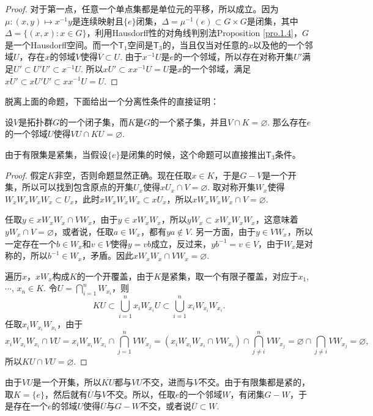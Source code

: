 \begin{proof}
	对于第一点，任意一个单点集都是单位元的平移，所以成立。因为$\mu:(x,y)\mapsto x^{-1}y$是连续映射且$\{e\}$闭集，$\Delta=\mu^{-1}(e)\subset G\times G$是闭集，其中$\Delta=\{(x,x):x\in G\}$，利用Hausdorff性的对角线判别法Proposition \ref{pro.1.4}，$G$是一个Hausdorff空间。而一个$\mathsf{T}_1$空间是$\mathsf{T}_3$的，当且仅当对任意的$x$以及他的一个邻域$U$，存在$x$的邻域$V$使得$\overline{V}\subset U$. 由于$x^{-1}U$是$e$的一个邻域，所以存在对称开集$U'$满足$U'\subset U'U'\subset x^{-1}U$. 所以$xU'\subset xx^{-1}U=U$是$x$的一个邻域，满足$\overline{xU'}\subset xU'U'\subset xx^{-1}U=U$.
\end{proof}

脱离上面的命题，下面给出一个分离性条件的直接证明：

\begin{pro}\label{1.16}
设$V$是拓扑群$G$的一个闭子集，而$K$是$G$的一个紧子集，并且$V\cap K=\varnothing$. 那么存在$e$的一个邻域$U$使得$VU\cap KU=\varnothing$.
\end{pro}

由于有限集是紧集，当假设$\{e\}$是闭集的时候，这个命题可以直接推出$\mathsf{T}_3$条件。

\begin{proof}
	假定$K$非空，否则命题显然正确。现在任取$x\in K$，于是$G-V$是一个开集，所以可以找到包含原点的开集$U_x$使得$xU_x\cap V=\varnothing$. 取对称开集$W_x$使得$W_xW_xW_xW_x\subset U_x$，此时$xW_xW_xW_x\subset xU_x$，所以$xW_xW_xW_x\cap V=\varnothing$. 

	任取$y\in xW_xW_x\cap VW_x$，由于$y\in xW_xW_x$，所以$yW_x\subset xW_xW_xW_x$，这意味着$yW_x\cap V=\varnothing$，或者说，任取$a\in W_x$，都有$ya\not\in V$. 另一方面，由于$y\in VW_x$，所以一定存在一个$b\in W_x$和$v\in V$使得$y=vb$成立，反过来，$yb^{-1}=v\in V$，由于$W_x$是对称的，所以$b^{-1}\in W_x$，矛盾。因此$xW_xW_x\cap VW_x=\varnothing$.

	遍历$x$，$xW_x$构成$K$的一个开覆盖，由于$K$是紧集，取一个有限子覆盖，对应于$x_1$, $\cdots$, $x_n\in K$. 令$U=\bigcap_{i=1}^n W_{x_i}$，则
	\[
	KU\subset \bigcup_{i=1}^n {x_i}W_{x_i}U\subset \bigcup_{i=1}^n x_iW_{x_i}W_{x_i}.
	\]
	任取$x_iW_{x_i}W_{x_i}$，由于
	\[
		x_iW_{x_i}W_{x_i}\cap VU=x_iW_{x_i}W_{x_i}\cap \bigcap_{j=1}^n VW_{x_j}=(x_iW_{x_i}W_{x_i}\cap VW_{x_i})\cap \bigcap_{j\neq i}^n VW_{x_j}=\varnothing \cap \bigcap_{j\neq i} VW_{x_j}=\varnothing,
	\]
	所以$KU\cap VU=\varnothing$.
\end{proof}

由于$VU$是一个开集，所以$\overline{KU}$都与$VU$不交，进而与$V$不交。由于有限集都是紧的，取$K=\{e\}$，然后就有$\overline{U}$与$V$不交。所以，任取$e$的一个邻域$W$，有闭集$G-W$，于是存在一个$e$的邻域$U$使得$\overline{U}$与$G-W$不交，或者说$\overline{U}\subset W$.

